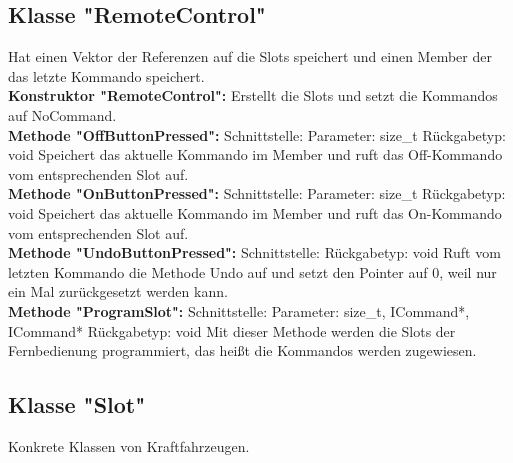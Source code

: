 \documentclass[12pt,a4paper]{article}
\begin{document}
\subsection {Klasse "RemoteControl"}
Hat einen Vektor der Referenzen auf die Slots speichert und einen Member der das letzte Kommando speichert.
\\

\textbf {Konstruktor "RemoteControl": } 
\newline
Erstellt die Slots und setzt die Kommandos auf NoCommand.
\\

\textbf {Methode "OffButtonPressed": } 
\newline
Schnittstelle:
\newline
Parameter: size\_t
\newline
Rückgabetyp: void
\newline
Speichert das aktuelle Kommando im Member und ruft das Off-Kommando vom entsprechenden Slot auf.
\\

\textbf {Methode "OnButtonPressed": } 
\newline
Schnittstelle:
\newline
Parameter: size\_t
\newline
Rückgabetyp: void
\newline
Speichert das aktuelle Kommando im Member und ruft das On-Kommando vom entsprechenden Slot auf.
\\

\textbf {Methode "UndoButtonPressed": } 
\newline
Schnittstelle:
\newline
Rückgabetyp: void
\newline
Ruft vom letzten Kommando die Methode Undo auf und setzt den Pointer auf 0, weil nur ein Mal zurückgesetzt werden kann.
\\

\textbf {Methode "ProgramSlot": } 
\newline
Schnittstelle:
\newline
Parameter: size\_t, ICommand*, ICommand*
\newline
Rückgabetyp: void
\newline
Mit dieser Methode werden die Slots der Fernbedienung programmiert, das heißt die Kommandos werden zugewiesen.
\\


\subsection {Klasse "Slot"}
Konkrete Klassen von Kraftfahrzeugen.
\\
\end{document}
